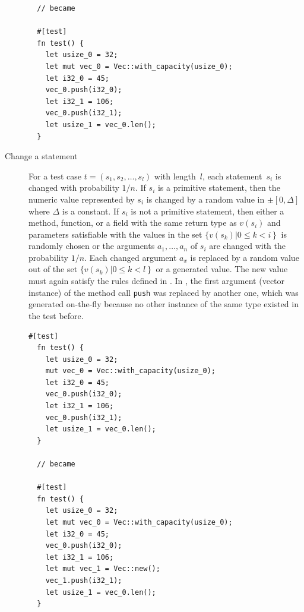 \documentclass[paper=a4,%
  twoside,%
  BCOR4mm,%
  abstract=true,%
  toc=bibliography,%
  chapterprefix=true,%
  toc=bibliographynumbered,%
  open=right,%
  english,%
  pagesize=pdftex]{scrreprt}
\begin{document}
\begin{description}
\begin{lstlisting}
  // became

  #[test]
  fn test() {
    let usize_0 = 32;
    let mut vec_0 = Vec::with_capacity(usize_0);
    let i32_0 = 45;
    vec_0.push(i32_0);
    let i32_1 = 106;
    vec_0.push(i32_1);
    let usize_1 = vec_0.len();
  }
  \end{lstlisting}

  \item[Change a statement] For a test case $t = (s_1, s_2, \dots, s_l)$ with length~$l$, each statement~$s_i$ is changed with probability $1/n$. If $s_i$ is a primitive statement, then the numeric value represented by $s_i$ is changed by a random value in $\pm[0,\Delta]$ where $\Delta$ is a constant. If $s_i$ is not a primitive statement, then either a method, function, or a field with the same return type as $v(s_i)$ and parameters satisfiable with the values in the set $\{v(s_k) \left| 0 \leq k < i \right\}$ is randomly chosen or the arguments $a_1, \dots, a_n$ of $s_i$ are changed with the probability $1/n$. Each changed argument $a_x$ is replaced by a random value out of the set $\{v(s_k) \left| 0 \leq k < l \right\}$ or a generated value. The new value must again satisfy the rules defined in . In , the first argument (vector instance) of the method call \texttt{push} was replaced by another one, which was generated on-the-fly because no other instance of the same type existed in the test before.

  \begin{lstlisting}[style=boxed, label=lst:mutation-input-value, caption={The first argument (which effectively is the method owner) of the call to \textit{push} (line 8) has been changed to a newly created value \textit{vec\string_1}}]
  #[test]
  fn test() {
    let usize_0 = 32;
    mut vec_0 = Vec::with_capacity(usize_0);
    let i32_0 = 45;
    vec_0.push(i32_0);
    let i32_1 = 106;
    vec_0.push(i32_1);
    let usize_1 = vec_0.len();
  }

  // became

  #[test]
  fn test() {
    let usize_0 = 32;
    let mut vec_0 = Vec::with_capacity(usize_0);
    let i32_0 = 45;
    vec_0.push(i32_0);
    let i32_1 = 106;
    let mut vec_1 = Vec::new();
    vec_1.push(i32_1);
    let usize_1 = vec_0.len();
  }
  \end{lstlisting}


\end{description}
\end{document}

